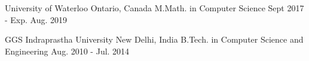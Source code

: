 

\begin{cventries}

  \cveducation
    {University of Waterloo} %
    {Ontario, Canada} %
    {M.Math. in Computer Science} %
    {Sept 2017 - Exp. Aug. 2019} %

  \cveducation
    {GGS Indraprastha University} %
    {New Delhi, India} %
    {B.Tech. in Computer Science and Engineering} %
    {Aug. 2010 - Jul. 2014} %

\end{cventries}
